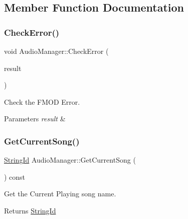 \subsection{Member Function Documentation}
\mbox{\label{classAudioManager_a37c83447f25569c6dc6b1d022230ad70}} 
\subsubsection{\texorpdfstring{Check\+Error()}{CheckError()}}
{\footnotesize\ttfamily void Audio\+Manager\+::\+Check\+Error (\begin{DoxyParamCaption}\item[{F\+M\+O\+D\+\_\+\+R\+E\+S\+U\+LT}]{result }\end{DoxyParamCaption})}



Check the F\+M\+OD Error. 


\begin{DoxyParams}{Parameters}
{\em result} & \\
\hline
\end{DoxyParams}
\mbox{\label{classAudioManager_ac1a61ce7acbbb62fa5b8f56870a8f674}} 
\subsubsection{\texorpdfstring{Get\+Current\+Song()}{GetCurrentSong()}}
{\footnotesize\ttfamily \hyperlink{classStringId}{String\+Id} Audio\+Manager\+::\+Get\+Current\+Song (\begin{DoxyParamCaption}{ }\end{DoxyParamCaption}) const}



Get the Current Playing song name. 

\begin{DoxyReturn}{Returns}
\hyperlink{classStringId}{String\+Id} 
\end{DoxyReturn}
\mbox{\label{classAudioManager_a7c46b6078950fdb622672bf10c58e87e}} 
